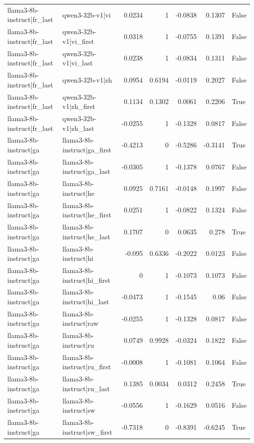 \begin{table}
\begin{tabular}{l l r r r r l}
llama3-8b-instruct|fr_last & qwen3-32b-v1|vi & 0.0234 & 1 & -0.0838 & 0.1307 & False \\
llama3-8b-instruct|fr_last & qwen3-32b-v1|vi_first & 0.0318 & 1 & -0.0755 & 0.1391 & False \\
llama3-8b-instruct|fr_last & qwen3-32b-v1|vi_last & 0.0238 & 1 & -0.0834 & 0.1311 & False \\
llama3-8b-instruct|fr_last & qwen3-32b-v1|zh & 0.0954 & 0.6194 & -0.0119 & 0.2027 & False \\
llama3-8b-instruct|fr_last & qwen3-32b-v1|zh_first & 0.1134 & 0.1302 & 0.0061 & 0.2206 & True \\
llama3-8b-instruct|fr_last & qwen3-32b-v1|zh_last & -0.0255 & 1 & -0.1328 & 0.0817 & False \\
llama3-8b-instruct|ga & llama3-8b-instruct|ga_first & -0.4213 & 0 & -0.5286 & -0.3141 & True \\
llama3-8b-instruct|ga & llama3-8b-instruct|ga_last & -0.0305 & 1 & -0.1378 & 0.0767 & False \\
llama3-8b-instruct|ga & llama3-8b-instruct|he & 0.0925 & 0.7161 & -0.0148 & 0.1997 & False \\
llama3-8b-instruct|ga & llama3-8b-instruct|he_first & 0.0251 & 1 & -0.0822 & 0.1324 & False \\
llama3-8b-instruct|ga & llama3-8b-instruct|he_last & 0.1707 & 0 & 0.0635 & 0.278 & True \\
llama3-8b-instruct|ga & llama3-8b-instruct|hi & -0.095 & 0.6336 & -0.2022 & 0.0123 & False \\
llama3-8b-instruct|ga & llama3-8b-instruct|hi_first & 0 & 1 & -0.1073 & 0.1073 & False \\
llama3-8b-instruct|ga & llama3-8b-instruct|hi_last & -0.0473 & 1 & -0.1545 & 0.06 & False \\
llama3-8b-instruct|ga & llama3-8b-instruct|raw & -0.0255 & 1 & -0.1328 & 0.0817 & False \\
llama3-8b-instruct|ga & llama3-8b-instruct|ru & 0.0749 & 0.9928 & -0.0324 & 0.1822 & False \\
llama3-8b-instruct|ga & llama3-8b-instruct|ru_first & -0.0008 & 1 & -0.1081 & 0.1064 & False \\
llama3-8b-instruct|ga & llama3-8b-instruct|ru_last & 0.1385 & 0.0034 & 0.0312 & 0.2458 & True \\
llama3-8b-instruct|ga & llama3-8b-instruct|sw & -0.0556 & 1 & -0.1629 & 0.0516 & False \\
llama3-8b-instruct|ga & llama3-8b-instruct|sw_first & -0.7318 & 0 & -0.8391 & -0.6245 & True \\

\end{tabular}
\end{table}
